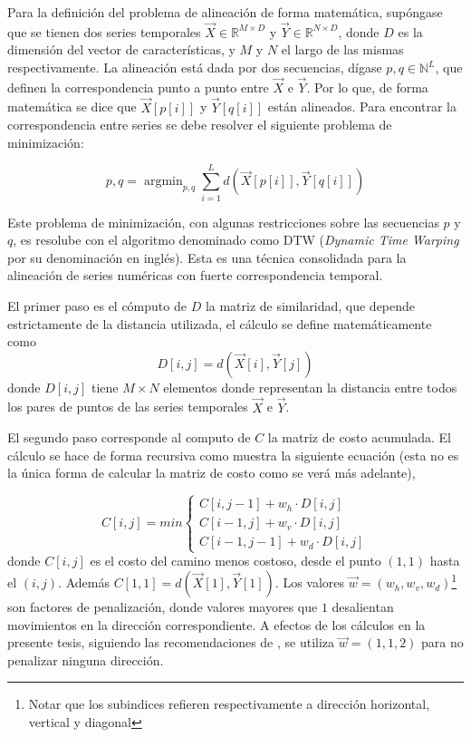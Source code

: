 \documentclass
  [ams,pdfout]%
	{aeslac}
\DeclareMathOperator*{\argmin}{argmin}
\begin{document}
Para la definición del problema de alineación de forma matemática, supóngase que se tienen dos series temporales $\vec{X}\in\mathbb{R}^{M\times D}$ y $\vec{Y}\in\mathbb{R}^{N\times D}$, donde $D$ es la dimensión del vector de características, y $M$ y $N$ el largo de las mismas respectivamente. La alineación está dada por dos secuencias, dígase $p, q \in \mathbb{N}^{L}$, que definen la correspondencia punto a punto entre $\vec{X}$ e $\vec{Y}$. Por lo que, de forma matemática se dice que $\vec{X}[p[i]]$ y $\vec{Y}[q[i]]$ están alineados. Para encontrar la correspondencia entre series se debe resolver el siguiente problema de minimización:

\begin{equation}
p,q = \argmin_{p,q} \sum_{i=1}^{L} d(\vec{X}[p[i]],\vec{Y}[q[i]]) 
\end{equation}

Este problema de minimización, con algunas restricciones sobre las secuencias $p$ y $q$, es resolube con el algoritmo denominado como DTW (\textit{Dynamic Time Warping} por su denominación en inglés). Esta es una técnica consolidada para la alineación de series numéricas con fuerte correspondencia temporal. 

El primer paso es el cómputo de $D$ la matriz de similaridad, que depende estrictamente de la distancia utilizada, el cálculo se define matemáticamente como
\begin{equation}
\label{eq:matrizsimilaridad}
D[i,j] = d(\vec{X}[i],\vec{Y}[j])
\end{equation}
donde $D[i,j]$ tiene $M\times N$ elementos donde representan la distancia entre todos los pares de puntos de las series temporales $\vec{X}$ e $\vec{Y}$.  


El segundo paso corresponde al computo de $C$ la matriz de costo acumulada. El cálculo se hace de forma recursiva como muestra la siguiente ecuación (esta no es la única forma de calcular la matriz de costo como se verá más adelante), 

\begin{equation}
\label{eq:matrizcosto}
C[i,j] = min\left\lbrace  
\begin{array}{ll}
C[i,j-1] + w_h\cdot D[i,j]\\
C[i-1,j] + w_v\cdot D[i,j]\\
C[i-1,j-1] + w_d\cdot D[i,j]
\end{array}
\right.
\end{equation}
donde $C[i,j]$ es el costo del camino menos costoso, desde el punto $(1,1)$ hasta el $(i,j)$. Además $C[1,1]=d(\vec{X}[1],\vec{Y}[1])$. Los valores $\vec{w}=(w_h,w_v,w_d)$\footnote{Notar que los subindices refieren respectivamente a dirección horizontal, vertical y diagonal} son factores de penalización, donde valores mayores que $1$ desalientan movimientos en la dirección correspondiente. A efectos de los cálculos en la presente tesis, siguiendo las recomendaciones de \cite{sakoe1978dynamic}, se utiliza $\vec{w}=(1,1,2)$ para no penalizar ninguna dirección. 
\end{document}
